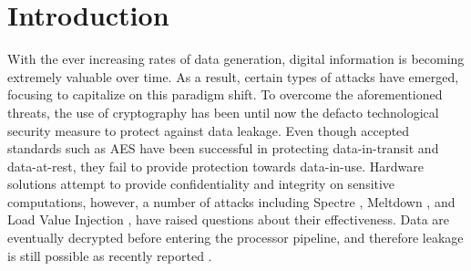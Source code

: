 \section{Introduction}

With the ever increasing rates of data generation, digital information is becoming extremely valuable over time. As a result, certain types of attacks have emerged, focusing to capitalize on this paradigm shift. To overcome the aforementioned threats, the use of cryptography has been until now the defacto technological security measure to protect against data leakage. Even though accepted standards such as AES have been successful in protecting data-in-transit and data-at-rest, they fail to provide protection towards data-in-use. Hardware solutions \cite{costan2016sgx-explained,trustzone} attempt to provide confidentiality and integrity on sensitive computations, however, a number of attacks \cite{yanga2, hely2012malicious, jin2012exposing, xiao2016hardware, karri2010trustworthy, tsoutsos2013fabrication,adee2008hunt, gross2018ending} including Spectre \cite{Kocher2018spectre}, Meltdown \cite{Lipp2018meltdown}, and Load Value Injection \cite{vanbulck2020lvi}, have raised questions about their effectiveness. Data are eventually decrypted before entering the processor pipeline, and therefore leakage is still possible as recently reported \cite{chen2018sgxpectre}. 






